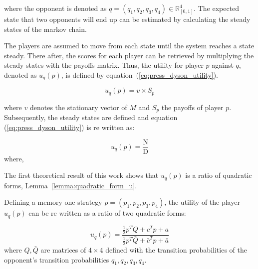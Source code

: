 \documentclass{article}
\begin{document}
where the opponent is denoted as \(q=(q_1, q_2, q_3, q_4) \in\mathbb{R}_{[0,1]}^{4}\).
The expected state that two opponents will end up can be estimated by calculating
the steady states of the markov chain.

The players are assumed to move from each state until the system reaches a 
state steady. There after, the scores for each player can be retrieved by 
multiplying the steady states with the payoffs matrix. Thus, the utility for 
player \(p\) against \(q\), denoted as \(u_q(p)\), is defined by equation~(\ref{eq:press_dyson_utility}).

\begin{equation}\label{eq:press_dyson_utility}
    u_q(p) = v \times S_{p}
\end{equation}

where \(v\) denotes the stationary vector of \(M\) and \(S_{p}\) the payoffs of
player \(p\). Subsequently, the steady states are defined and equation
(\ref{eq:press_dyson_utility}) is re written as:

\begin{equation}
    u_q(p) = \frac{\text{N}}{\text{D}}
\end{equation}
where,

The first theoretical result of this work shows that \(u_q(p)\) is a ratio of 
quadratic forms, Lemma~\ref{lemma:quadratic_form_u}.

Defining a memory one strategy \(p = (p_1, p_2, p_3, p_4)\), the 
utility of the player \(u_q(p)\) can be re written as a ratio of two quadratic
forms:

\begin{equation}\label{eq:optimisation_quadratic}
u_q(p) = \frac{\frac{1}{2}p^TQ + c^Tp + a}
            {\frac{1}{2}p^T\bar{Q} + \bar{c}^Tp + \bar{a}} 
\end{equation}
where \(Q, \bar{Q}\) are matrices of \(4 \times 4\) defined with the transition
probabilities of the opponent's transition probabilities \(q_1, q_2, q_3, q_4\).


    
\end{document}
